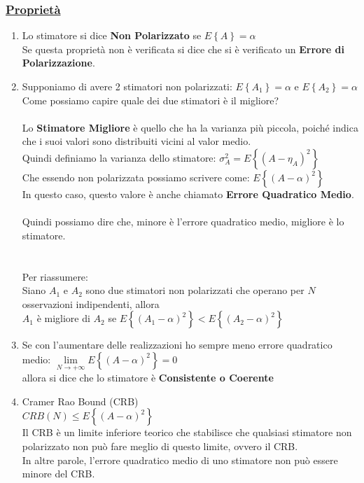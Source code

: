 \documentclass{article}
\begin{document}
\subsubsection{\underline{Proprietà}}
\begin{enumerate}
    \item Lo stimatore si dice \textbf{Non Polarizzato} se $E\left\{ A \right\} = \alpha$ \\
    Se questa proprietà non è verificata si dice che si è verificato un \textbf{Errore di Polarizzazione}.
    \item Supponiamo di avere 2 stimatori non polarizzati: $E\left\{ A_1 \right\} = \alpha$ e $E\left\{ A_2 \right\} = \alpha$ \\
    Come possiamo capire quale dei due stimatori è il migliore? \\ \\
    Lo \textbf{Stimatore Migliore} è quello che ha la varianza più piccola, poiché indica che i suoi valori sono distribuiti vicini al valor medio. \\
    Quindi definiamo la varianza dello stimatore: $\sigma_A^2 = E\left\{ (A-\eta_A)^2 \right\}$ \\
    Che essendo non polarizzata possiamo scrivere come: $E\left\{ (A-\alpha)^2 \right\}$ \\
    In questo caso, questo valore è anche chiamato \textbf{Errore Quadratico Medio}. \\ \\
    Quindi possiamo dire che, minore è l'errore quadratico medio, migliore è lo stimatore.  \\ \\ \\
    Per riassumere: \\
    Siano $A_1$ e $A_2$ sono due stimatori non polarizzati che operano per $N$ osservazioni indipendenti, allora \\
    $A_1$ è migliore di $A_2$ se $E\left\{ (A_1 - \alpha)^2 \right\} < E\left\{ (A_2 - \alpha)^2 \right\}$
    \item Se con l'aumentare delle realizzazioni ho sempre meno errore quadratico medio: $\underset{N \to + \infty}{\lim} E\left\{ (A-\alpha)^2 \right\} = 0$ \\
    allora si dice che lo stimatore è \textbf{Consistente o Coerente}
    \item Cramer Rao Bound (CRB) \\
    $CRB(N) \leq E\left\{ (A-\alpha)^2 \right\}$ \\
    Il CRB è un limite inferiore teorico che stabilisce che qualsiasi stimatore non polarizzato non può fare meglio di questo limite, ovvero il CRB. \\
    In altre parole, l'errore quadratico medio di uno stimatore non può essere minore del CRB.
\end{enumerate}
\end{document}
